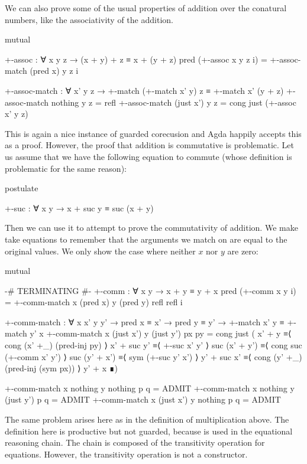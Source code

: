 We can also prove some of the usual properties of addition over the conatural
numbers, like the associativity of the addition.
\begin{code}[hide]
mutual
\end{code}
\begin{code}
  +-assoc : ∀ x y z → (x + y) + z ≡ x + (y + z)
  pred (+-assoc x y z i) = +-assoc-match (pred x) y z i

  +-assoc-match :
    ∀ x' y z →
    +-match (+-match x' y) z ≡ +-match x' (y + z)
  +-assoc-match nothing    y z = refl
  +-assoc-match (just x')  y z = cong just (+-assoc x' y z)
\end{code}
This is again a nice instance of guarded corecusion and Agda happily accepts
this as a proof. However, the proof that addition is commutative is problematic.
Let us assume that we have the following equation to commute 
(whose definition is problematic for the same reason):
\begin{code}[hide]
postulate
\end{code}
\begin{code}
  +-suc : ∀ x y → x + suc y ≡ suc (x + y)
\end{code}
Then we can use it to attempt to prove the commutativity of addition. We make
 take equations to remember that the arguments we
match on are equal to the original values. We only show the case where neither
$x$ nor $y$ are zero:
\begin{code}[hide]
mutual
\end{code}
\begin{code}
  {-# TERMINATING #-}
  +-comm : ∀ x y → x + y ≡ y + x
  pred (+-comm x y i) =
    +-comm-match x (pred x) y (pred y) refl refl i

  +-comm-match :
    ∀ x x' y y' → pred x ≡ x' → pred y ≡ y' →
    +-match x' y ≡ +-match y' x
  +-comm-match x (just x') y (just y') px py =
    cong just
      (  x' + y         ≡⟨ cong (x' +_) (pred-inj py) ⟩
         x' + suc y'    ≡⟨ +-suc x' y' ⟩
         suc (x' + y')  ≡⟨ cong suc (+-comm x' y') ⟩
         suc (y' + x')  ≡⟨ sym (+-suc y' x') ⟩
         y' + suc x'    ≡⟨ cong (y' +_) (pred-inj (sym px)) ⟩
         y' + x         ∎)
\end{code}
\begin{code}[hide]
  +-comm-match x nothing y nothing p q = ADMIT
  +-comm-match x nothing y (just y') p q = ADMIT
  +-comm-match x (just x') y nothing p q = ADMIT
\end{code}
The same problem arises here as in the definition of multiplication above. The
definition here is productive but not guarded, because  is
used in the equational reasoning chain. The chain is composed of the
transitivity operation for equations. However, the transitivity operation is not
a constructor.
